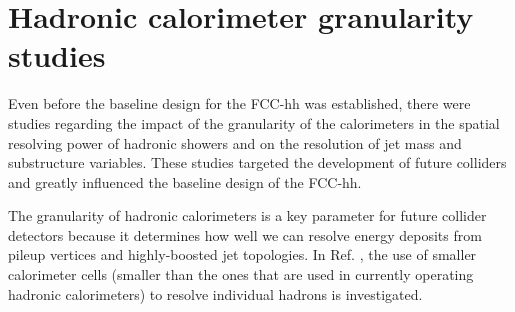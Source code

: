 \section{Hadronic calorimeter granularity studies}
\label{sec:gran}

Even before the baseline design for the FCC-hh was established, there were studies regarding the impact of the granularity of the calorimeters in the spatial resolving power of hadronic showers and on the resolution of jet mass and substructure variables. These studies targeted the development of future colliders and greatly influenced the baseline design of the FCC-hh.

The granularity of hadronic calorimeters is a key parameter for future collider detectors because it determines how well we can resolve energy deposits from pileup vertices and highly-boosted jet topologies. In Ref. \cite{FCC_HCALgran_doubleK}, the use of smaller calorimeter cells (smaller than the ones that are used in currently operating hadronic calorimeters) to resolve individual hadrons is investigated. 
